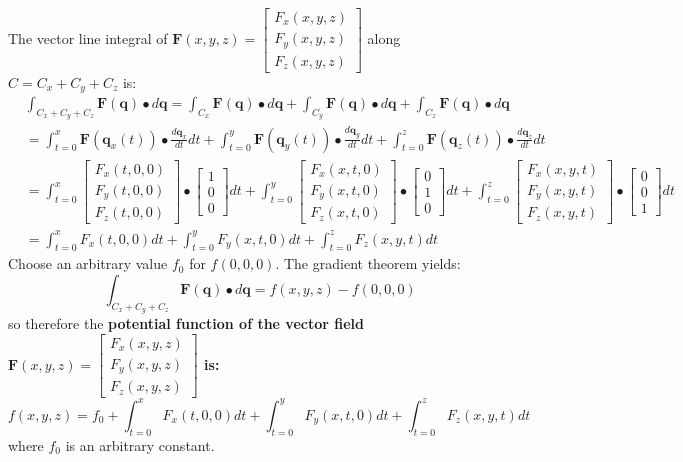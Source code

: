 \documentclass{article}
\begin{document}
The vector line integral of \(\mathbf{F}(x,y,z) = \begin{bmatrix} F_x(x,y,z) \\ F_y(x,y,z) \\ F_z(x,y,z) \end{bmatrix}\) along \(C = C_x + C_y + C_z\) is: 
\begin{align*}
& \int_{C_x + C_y + C_z} \mathbf{F}(\mathbf{q}) \bullet d\mathbf{q} 
= \int_{C_x} \mathbf{F}(\mathbf{q}) \bullet d\mathbf{q} + \int_{C_y} \mathbf{F}(\mathbf{q}) \bullet d\mathbf{q} + \int_{C_z} \mathbf{F}(\mathbf{q}) \bullet d\mathbf{q} \\
& = \int_{t = 0}^x \mathbf{F}(\mathbf{q}_{x}(t)) \bullet \frac{d\mathbf{q}_x}{dt}dt + \int_{t = 0}^y \mathbf{F}(\mathbf{q}_{y}(t)) \bullet \frac{d\mathbf{q}_y}{dt}dt + \int_{t = 0}^z \mathbf{F}(\mathbf{q}_{z}(t)) \bullet \frac{d\mathbf{q}_z}{dt}dt \\
& = \int_{t = 0}^x \begin{bmatrix} F_x(t,0,0) \\ F_y(t,0,0) \\ F_z(t,0,0) \end{bmatrix} \bullet \begin{bmatrix} 1 \\ 0 \\ 0 \end{bmatrix}dt + \int_{t = 0}^y \begin{bmatrix} F_x(x,t,0) \\ F_y(x,t,0) \\ F_z(x,t,0) \end{bmatrix} \bullet \begin{bmatrix} 0 \\ 1 \\ 0 \end{bmatrix}dt + \int_{t = 0}^z \begin{bmatrix} F_x(x,y,t) \\ F_y(x,y,t) \\ F_z(x,y,t) \end{bmatrix} \bullet \begin{bmatrix} 0 \\ 0 \\ 1 \end{bmatrix}dt \\ 
& = \int_{t = 0}^x F_x(t,0,0)dt + \int_{t = 0}^y F_y(x,t,0)dt + \int_{t = 0}^z F_z(x,y,t)dt
\end{align*}
Choose an arbitrary value \(f_0\) for \(f(0,0,0)\). The gradient theorem yields:
\[\int_{C_x + C_y + C_z} \mathbf{F}(\mathbf{q}) \bullet d\mathbf{q} = f(x,y,z) - f(0,0,0)\]
so therefore the {\bf potential function of the vector field \(\mathbf{F}(x,y,z) = \begin{bmatrix} F_x(x,y,z) \\ F_y(x,y,z) \\ F_z(x,y,z) \end{bmatrix}\) is:}
\[f(x,y,z) = f_0 + \int_{t = 0}^x F_x(t,0,0)dt + \int_{t = 0}^y F_y(x,t,0)dt + \int_{t = 0}^z F_z(x,y,t)dt\]
where \(f_0\) is an arbitrary constant. 
\end{document}
